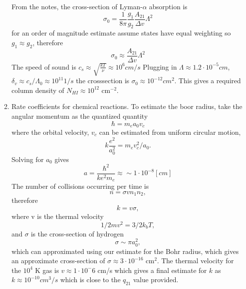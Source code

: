 \documentclass{article}
\begin{document}
\begin{enumerate}
        From the notes, the cross-section of Lyman-$\alpha$ absorption is 
        \begin{equation}
            \sigma_0 = \frac{1}{8 \pi} \frac{g_1}{g_2} \frac{A_{21}}{\Delta v} \Lambda^2
        \end{equation}
        for an order of magnitude estimate assume states have equal weighting so $g_1 \approx g_2$, therefore
        \begin{equation}
            \sigma_0 \approx \frac{A_{21}}{\Delta v} \Lambda^2
        \end{equation}
        The speed of sound is $c_s \approx \sqrt{\frac{k T}{\nu}} \approx 10^6 cm / s$
        Plugging in $\Lambda \approx 1.2 \cdot 10^{-5} cm$, $\delta_v \approx c_s / \Lambda_0 \approx 10^{11} 1/s$ the crosssection is $\sigma_0 \approx 10^{-12} cm^{2}$. 
        This gives a required column density of $N_{HI} \approx 10^{12}$ cm$^{-2}$.
    \item Rate coefficients for chemical reactions. 
        To estimate the boor radius, take the angular momentum as the quantized quantity 
        \begin{equation}
            \hbar = m_e a_0 v_c
        \end{equation}
        where the orbital velocity, $v_c$ can be estimated from uniform circular motion,
        \begin{equation}
            k \frac{e^2}{a_0^2} = m_e v_c^2 / a_0.
        \end{equation}
        Solving for $a_0$ gives 
        \begin{equation}
            a = \frac{\hbar^2}{k e^2 m_e} \approx \sim 1\cdot 10^{-8} [cm]
        \end{equation}
        The number of collisions occurring per time is
        \begin{equation}
            n = \sigma v n_1 n_2,
        \end{equation}
        therefore 
        \begin{equation}
            k = v \sigma,
        \end{equation} 
        where v is the thermal velocity
        \begin{equation}
            1/2 m v^2 = 3/2 k_b T,
        \end{equation}
        and $\sigma$ is the cross-section of hydrogen
        \begin{equation}
            \sigma \sim \pi a_0^2,
        \end{equation}
        which can approximated using our estimate for the Bohr radius, which gives an approximate cross-section of $\sigma \approx 3 \cdot 10^{-16}$ cm$^2$. 
        The thermal velocity for the $10^4$ K gas is $v \approx  1 \cdot 10^-6$ cm/s which gives a final estimate for $k$ as $k \approx 10^{-10} cm^3 / s$ which is close to the $q_{21}$ value provided.  
  \end{enumerate} 
\end{document}
